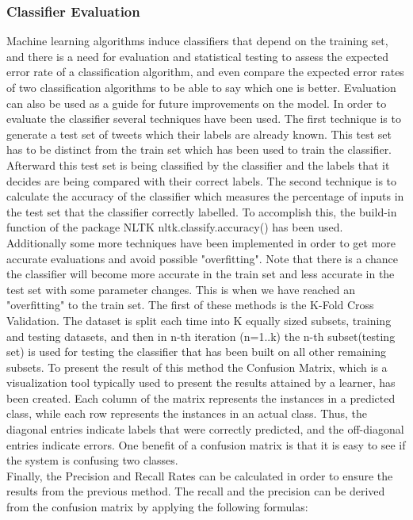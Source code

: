\subsubsection{Classifier Evaluation} 
Machine learning algorithms induce classifiers that depend on the training set, and there is a need for evaluation and statistical testing to assess the expected error rate of a classification algorithm, and even compare the expected error rates of two classification algorithms to be able to say which one is better. Evaluation can also be used as a guide for future improvements on the model. In order to evaluate the classifier several techniques have been used. The first technique is to generate a test set of tweets which their labels are already known. This test set has to be distinct from the train set which has been used to train the classifier. Afterward this test set is being classified by the classifier and the labels that it decides are being compared with their correct labels. The second technique is to calculate the accuracy of the classifier which measures the percentage of inputs in the test set that the classifier correctly labelled. To accomplish this, the build-in function of the package NLTK nltk.classify.accuracy() has been used. \\
Additionally some more techniques have been implemented in order to get more accurate evaluations and avoid possible "overfitting". Note that there is a chance the classifier will become more accurate in the train set and less accurate in the test set with some parameter changes. This is when we have reached an "overfitting" to the train set. The first of these methods is the K-Fold Cross Validation. The dataset is split each time into K equally sized subsets, training and testing datasets, and then in n-th iteration (n=1..k) the n-th subset(testing set) is used for testing the classifier that has been built on all other remaining subsets. To present the result of this method the Confusion Matrix, which is a visualization tool typically used to present the results attained by a learner, has been created. Each column of the matrix represents the instances in a predicted class, while each row represents the instances in an actual class. Thus, the diagonal entries indicate labels that were correctly predicted, and the off-diagonal entries indicate errors. One benefit of a confusion matrix is that it is easy to see if the system is confusing two classes. \\
Finally, the Precision and Recall Rates can be calculated in order to ensure the results from the previous method. The recall and the precision can be derived from the confusion matrix by applying the following formulas:

